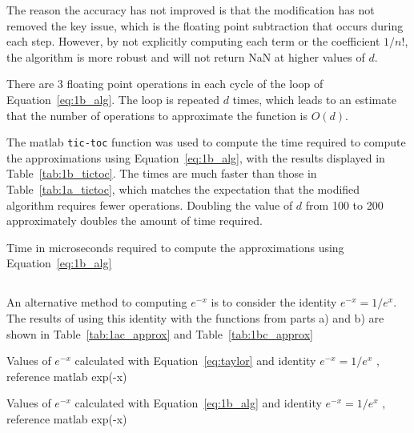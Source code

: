 \documentclass[11pt]{article} %
\begin{document}
The reason the accuracy has not improved is that the modification has not removed the key issue, which is the floating point subtraction that occurs during each step. However, by not explicitly computing each term or the coefficient $1/n!$, the algorithm is more robust and will not return NaN at higher values of $d$. 

There are $3$ floating point operations in each cycle of the loop of Equation~\ref{eq:1b_alg}. The loop is repeated $d$ times, which leads to an estimate that the number of operations to approximate the function is $O(d)$.

The matlab \verb!tic-toc! function was used to compute the time required to compute the approximations using  Equation~\ref{eq:1b_alg}, with the results displayed in Table~\ref{tab:1b_tictoc}. The times are much faster than those in Table~\ref{tab:1a_tictoc}, which matches the expectation that the modified algorithm requires fewer operations. Doubling the value of $d$ from 100 to 200 approximately doubles the amount of time required.

\begin{table}[h!]
\centering

%
\caption{Time in microseconds required to compute the approximations using Equation~\ref{eq:1b_alg}}
\label{tab:1b_tictoc}
\end{table}

\subsection{} %

An alternative method to computing $e^{-x}$ is to consider the identity $e^{-x} = 1/e^x$. The results of using this identity with the functions from parts a) and b) are shown in Table~\ref{tab:1ac_approx} and Table~\ref{tab:1bc_approx}

\begin{table}[h!]
\centering


\caption{Values of $e^{-x}$ calculated with Equation~\ref{eq:taylor} and identity $e^{-x} = 1/e^x$ , reference matlab exp(-x)}
\label{tab:1ac_approx}
\end{table}

\begin{table}[h!]
\centering


\caption{Values of $e^{-x}$ calculated with Equation~\ref{eq:1b_alg} and identity $e^{-x} = 1/e^x$ , reference matlab exp(-x)}
\label{tab:1bc_approx}
\end{table}
\end{document}
